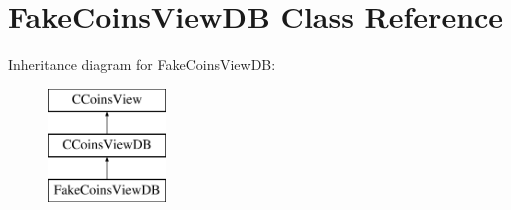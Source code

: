 \hypertarget{class_fake_coins_view_d_b}{}\section{Fake\+Coins\+View\+DB Class Reference}
\label{class_fake_coins_view_d_b}
Inheritance diagram for Fake\+Coins\+View\+DB\+:\begin{figure}[H]
\begin{center}
\leavevmode
\includegraphics[height=3.000000cm]{class_fake_coins_view_d_b}
\end{center}
\end{figure}
